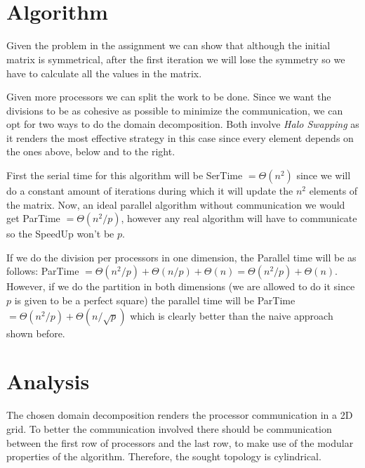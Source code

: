 \documentclass[a4paper]{article}
\title{\HWTitle \\ \vspace{.25cm} \large\HWSubtitle}
\author{\HWAuthorName}
\date{\HWDueDate}
\begin{document}
\maketitle
\thispagestyle{fancy}

\section{Algorithm}
    Given the problem in the assignment we can show that although the initial matrix is symmetrical, after the first iteration we will lose the symmetry so we have to calculate all the values in the matrix.

    Given more processors we can split the work to be done. Since we want the divisions to be as cohesive as possible to minimize the communication, we can opt for two ways to do the domain decomposition. Both involve \emph{Halo Swapping} as it renders the most effective strategy in this case since every element depends on the ones above, below and to the right.

    First the serial time for this algorithm will be SerTime $ = \Theta(n^2)$ since we will do a constant amount of iterations during which it will update the $n^2$ elements of the matrix. Now, an ideal parallel algorithm without communication we would get ParTime $ = \Theta(n^2 / p)$, however any real algorithm will have to communicate so the SpeedUp won't be $p$.

    If we do the division per processors in one dimension, the Parallel time will be as follows: ParTime $= \Theta(n^2/p) + \Theta(n/p) + \Theta(n) = \Theta(n^2/p) + \Theta(n) $. However, if we do the partition in both dimensions (we are allowed to do it since $p$ is given to be a perfect square) the parallel time will be ParTime $= \Theta(n^2/p) + \Theta(n/\sqrt{p})$ which is clearly better than the naive approach shown before.


\section{Analysis}
    The chosen domain decomposition renders the processor communication in a 2D grid. To better the communication involved there should be communication between the first row of processors and the last row, to make use of the modular properties of the algorithm. Therefore, the sought topology is cylindrical.
\end{document}

